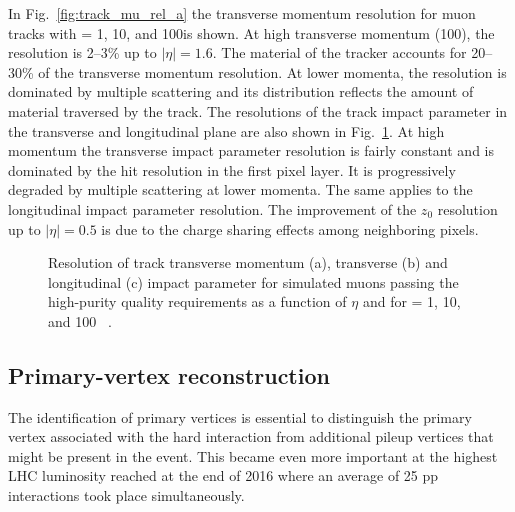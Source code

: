 In Fig.~\ref{fig:track_mu_rel_a} the transverse momentum resolution for muon tracks with \pt = 1, 10, and 100\GeV is shown. At high transverse momentum (100\GeV), the resolution is 2--3\% up to $|\eta| = 1.6$.
The material of the tracker accounts for 20--30\% of the transverse momentum resolution.
At lower momenta, the resolution is dominated by multiple scattering and its distribution reflects the amount of material traversed by the track.
The resolutions of the track impact parameter in the transverse and longitudinal plane are also shown in Fig.~\ref{fig:track_mu_rel}. At high momentum the transverse impact parameter resolution is fairly constant and is dominated by the hit resolution in the first pixel layer. It is progressively degraded by multiple scattering at lower momenta. The same applies to the longitudinal impact parameter resolution. The improvement of the $z_0$ resolution up to $|\eta| = 0.5$ is due to the charge sharing effects among neighboring pixels.

\begin{figure}[!htb]
\centering
{}
\caption{Resolution of track transverse momentum (a), transverse (b) and longitudinal (c) impact parameter for simulated muons passing the high-purity quality requirements as a function of $\eta$ and for \pt = 1, 10, and 100 \GeV~\cite{Chatrchyan:2014fea}.}
\label{fig:track_mu_rel}
\end{figure}

\subsection{Primary-vertex reconstruction}

The identification of primary vertices is essential to distinguish the primary vertex associated with the hard interaction from additional pileup vertices that might be present in the event. This became even more important at the highest LHC luminosity reached at the end of 2016 where an average of 25 pp interactions took place simultaneously.\\

